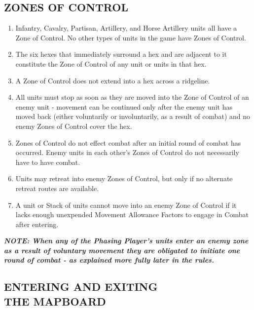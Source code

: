 \subsection{ZONES OF CONTROL}

\begin{enumerate}
  \item Infantry, Cavalry, Partisan, Artillery, and Horse Artillery units all have a Zone of Control. No other types of units in the game have Zones of Control.

  \item The six hexes that immediately surround a hex and are adjacent to it constitute the Zone of Control of any unit or units in that hex.

  \item A Zone of Control does not extend into a hex across a ridgeline.

  \item All units must stop as soon as they are moved into the Zone of Control of an enemy unit - movement can be continued only after the enemy unit has moved back (either voluntarily or involuntarily, as a result of combat) and no enemy Zones of Control cover the hex.

  \item Zones of Control do not effect combat after an initial round of combat has occurred. Enemy units in each other's Zones of Control do not necessarily have to have combat.

  \item Units may retreat into enemy Zones of Control, but only if no alternate retreat routes are available.

  \item A unit or Stack of units cannot move into an enemy Zone of Control if it lacks enough unexpended Movement Allowance Factors to engage in Combat after entering.
\end{enumerate}

\textbf{\textit{NOTE: When any of the Phasing Player's units enter an enemy zone as a result of voluntary movement they are obligated to initiate one round of combat - as explained more fully later in the rules.}}

\subsection{ENTERING AND EXITING\\THE MAPBOARD}

